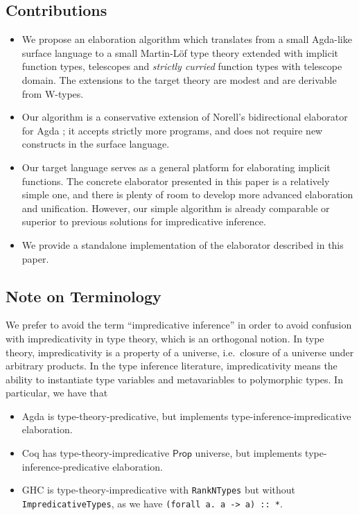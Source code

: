 \documentclass[acmsmall,review,anonymous]{acmart}\settopmatter{printfolios=true,printccs=false,printacmref=false}
\begin{document}
\subsection{Contributions}
\begin{itemize}
  \item We propose an elaboration algorithm which translates from a small
    Agda-like surface language to a small Martin-L\"of type theory extended with
    implicit function types, telescopes and \emph{strictly curried} function
    types with telescope domain. The extensions to the target theory are modest
    and are derivable from W-types.
  \item Our algorithm is a conservative extension of Norell's bidirectional
    elaborator for Agda \cite[Chapter~3.6]{norell07thesis}; it accepts strictly more
    programs, and does not require new constructs in the surface language.
  \item Our target language serves as a general platform for elaborating
    implicit functions. The concrete elaborator presented in this paper is a
    relatively simple one, and there is plenty of room to develop more advanced
    elaboration and unification. However, our simple algorithm is already
    comparable or superior to previous solutions for impredicative inference.
  \item We provide a standalone implementation of the elaborator described in
    this paper.
\end{itemize}

\subsection{Note on Terminology}

We prefer to avoid the term ``impredicative inference'' in order to avoid
confusion with impredicativity in type theory, which is an orthogonal notion. In
type theory, impredicativity is a property of a universe, i.e.\ closure of a
universe under arbitrary products. In the type inference literature,
impredicativity means the ability to instantiate type variables and
metavariables to polymorphic types. In particular, we have that
\begin{itemize}
  \item Agda is type-theory-predicative, but implements type-inference-impredicative elaboration.
  \item Coq has type-theory-impredicative $\mathsf{Prop}$ universe, but
    implements type-inference-predicative elaboration.
  \item GHC is type-theory-impredicative with \texttt{RankNTypes} but without
    \texttt{ImpredicativeTypes}, as we have \texttt{(forall a. a -> a) :: *}.

\end{itemize}
\end{document}
